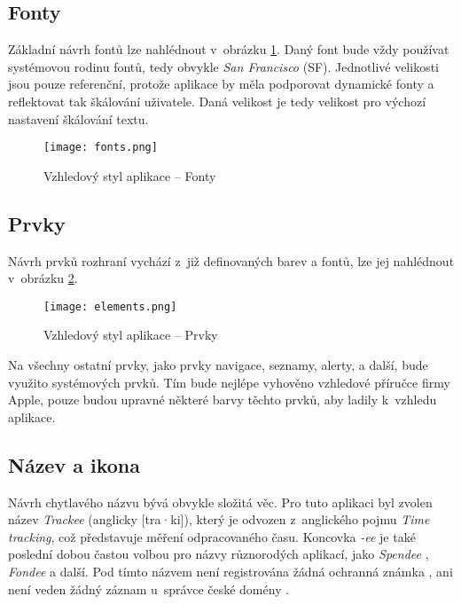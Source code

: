 \subsection{Fonty}

Základní návrh fontů lze nahlédnout v~obrázku \ref{fig:fonts}. Daný font bude vždy používat systémovou rodinu fontů, tedy obvykle \emph{San Francisco} (SF). Jednotlivé velikosti jsou pouze referenční, protože aplikace by měla podporovat dynamické fonty a reflektovat tak škálování uživatele. Daná velikost je tedy velikost pro výchozí nastavení škálování textu.

\begin{figure}[h]
	\centering
	\texttt{[image: fonts.png]}
	\caption{Vzhledový styl aplikace – Fonty}
	\label{fig:fonts}
\end{figure}

\subsection{Prvky}

Návrh prvků rozhraní vychází z~již definovaných barev a fontů, lze jej nahlédnout v~obrázku \ref{fig:elements}.

\begin{figure}[h]
	\centering
	\texttt{[image: elements.png]}
	\caption{Vzhledový styl aplikace – Prvky}
	\label{fig:elements}
\end{figure}

Na všechny ostatní prvky, jako prvky navigace, seznamy, alerty, a další, bude využito systémových prvků. Tím bude nejlépe vyhověno vzhledové příručce firmy Apple, pouze budou upravné některé barvy těchto prvků, aby ladily k~vzhledu aplikace.

\subsection{Název a ikona}

Návrh chytlavého názvu bývá obvykle složitá věc. Pro tuto aplikaci byl zvolen název \emph{Trackee} (anglicky [tra·ki]), který je odvozen z~anglického pojmu \emph{Time tracking}, což představuje měření odpracovaného času. Koncovka \emph{-ee} je také poslední dobou častou volbou pro názvy různorodých aplikací, jako \emph{Spendee} \cite{spendee}, \emph{Fondee} \cite{fondee} a další. Pod tímto názvem není registrována žádná ochranná známka \cite{upd-database}, ani není veden žádný záznam u~správce české domény \cite{cz-nic-trackee}.

